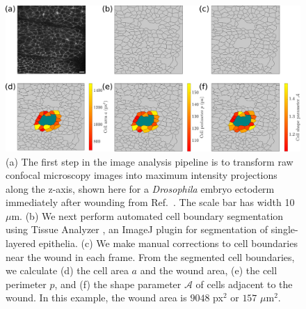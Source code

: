 \documentclass[%
 reprint,
superscriptaddress,
 amsmath,amssymb,
pre,
]{revtex4-2}
\begin{document}
\begin{figure}
    \centering
    \includegraphics[width=\linewidth]{suppFigures/SuppFigImagePipeline.eps}
\caption{(a) The first step in the image analysis pipeline is to transform raw confocal microscopy images into maximum intensity projections along the z-axis, shown here for a \textit{Drosophila} embryo ectoderm immediately after wounding from Ref.~\cite{tetley2019tissue}. The scale bar has width 10 $\mu$m. (b) We next perform automated cell boundary segmentation using Tissue Analyzer \cite{Aigouy2016}, an ImageJ plugin for segmentation of single-layered epithelia. (c) We make manual corrections to cell boundaries near the wound in each frame. From the segmented cell boundaries, we calculate (d) the cell area $a$ and the wound area, (e) the cell perimeter $p$, and (f) the shape parameter $\mathcal{A}$ of cells adjacent to the wound. In this example, the wound area is $9048$ px$^2$ or $157$ $\mu$m$^2$.}
\label{suppfig:imagAnalysisPipeline}
\end{figure}
\end{document}
